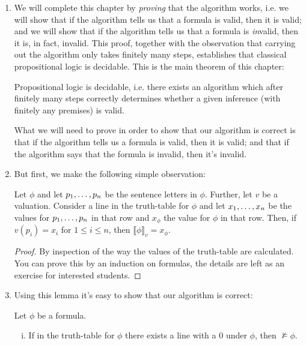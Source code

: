 \begin{enumerate}[\thesection.1]
	\item We will complete this chapter by \emph{proving} that the algorithm works, i.e. we will show that if the algorithm tells us that a formula is valid, then it is valid; and we will show that if the algorithm tells us that a formula is \emph{in}valid, then it is, in fact, invalid. This proof, together with the observation that carrying out the algorithm only takes finitely many steps, establishes that classical propositional logic is decidable. This is the main theorem of this chapter:
	
	\begin{theorem}
	Propositional logic is decidable, i.e. there exists an algorithm which after finitely many steps correctly determines whether a given inference (with finitely any premises) is valid.
	\end{theorem}
	What we will need to prove in order to show that our algorithm is correct is that if the algorithm tells us a formula is valid, then it is valid; and that if the algorithm says that the formula is invalid, then it's invalid. 	
	
	\item But first, we make the following simple observation:
	
		\begin{lemma}
		Let $\phi$ and let $p_1, \mathellipsis, p_n$ be the sentence letters in $\phi$. Further, let $v$ be a valuation. Consider a line in the truth-table for $\phi$ and let $x_1, \mathellipsis, x_n$ be the values for $p_1, \mathellipsis, p_n$ in that row and $x_\phi$ the value for $\phi$ in that row. Then, if $v(p_i)=x_i$ for $1\leq i\leq n$, then $\llbracket \phi\rrbracket_v=x_\phi$.
		\end{lemma}
		\begin{proof}
		By inspection of the way the values of the truth-table are calculated. You can prove this by an induction on formulas, the details are left as an exercise for interested students.
		\end{proof}
		
	\item Using this lemma it's easy to show that our algorithm is correct:
	
		\begin{theorem} Let $\phi$ be a formula.
		
		\begin{enumerate}[(i)]
		
			\item  If in the truth-table for $\phi$ there exists a line with a 0 under $\phi$, then $\nvDash\phi$.
			

\end{enumerate}
\end{theorem}
\end{enumerate}
